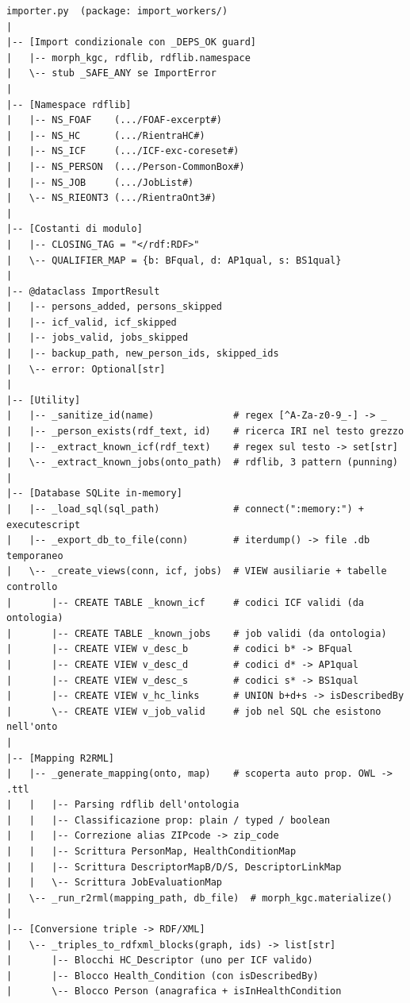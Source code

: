 \documentclass[a4paper,12pt]{article}
\begin{document}
\begin{lstlisting}[caption={Pseudo-outline di \texttt{importer.py}.}, numbers=none]
importer.py  (package: import_workers/)
|
|-- [Import condizionale con _DEPS_OK guard]
|   |-- morph_kgc, rdflib, rdflib.namespace
|   \-- stub _SAFE_ANY se ImportError
|
|-- [Namespace rdflib]
|   |-- NS_FOAF    (.../FOAF-excerpt#)
|   |-- NS_HC      (.../RientraHC#)
|   |-- NS_ICF     (.../ICF-exc-coreset#)
|   |-- NS_PERSON  (.../Person-CommonBox#)
|   |-- NS_JOB     (.../JobList#)
|   \-- NS_RIEONT3 (.../RientraOnt3#)
|
|-- [Costanti di modulo]
|   |-- CLOSING_TAG = "</rdf:RDF>"
|   \-- QUALIFIER_MAP = {b: BFqual, d: AP1qual, s: BS1qual}
|
|-- @dataclass ImportResult
|   |-- persons_added, persons_skipped
|   |-- icf_valid, icf_skipped
|   |-- jobs_valid, jobs_skipped
|   |-- backup_path, new_person_ids, skipped_ids
|   \-- error: Optional[str]
|
|-- [Utility]
|   |-- _sanitize_id(name)              # regex [^A-Za-z0-9_-] -> _
|   |-- _person_exists(rdf_text, id)    # ricerca IRI nel testo grezzo
|   |-- _extract_known_icf(rdf_text)    # regex sul testo -> set[str]
|   \-- _extract_known_jobs(onto_path)  # rdflib, 3 pattern (punning)
|
|-- [Database SQLite in-memory]
|   |-- _load_sql(sql_path)             # connect(":memory:") + executescript
|   |-- _export_db_to_file(conn)        # iterdump() -> file .db temporaneo
|   \-- _create_views(conn, icf, jobs)  # VIEW ausiliarie + tabelle controllo
|       |-- CREATE TABLE _known_icf     # codici ICF validi (da ontologia)
|       |-- CREATE TABLE _known_jobs    # job validi (da ontologia)
|       |-- CREATE VIEW v_desc_b        # codici b* -> BFqual
|       |-- CREATE VIEW v_desc_d        # codici d* -> AP1qual
|       |-- CREATE VIEW v_desc_s        # codici s* -> BS1qual
|       |-- CREATE VIEW v_hc_links      # UNION b+d+s -> isDescribedBy
|       \-- CREATE VIEW v_job_valid     # job nel SQL che esistono nell'onto
|
|-- [Mapping R2RML]
|   |-- _generate_mapping(onto, map)    # scoperta auto prop. OWL -> .ttl
|   |   |-- Parsing rdflib dell'ontologia
|   |   |-- Classificazione prop: plain / typed / boolean
|   |   |-- Correzione alias ZIPcode -> zip_code
|   |   |-- Scrittura PersonMap, HealthConditionMap
|   |   |-- Scrittura DescriptorMapB/D/S, DescriptorLinkMap
|   |   \-- Scrittura JobEvaluationMap
|   \-- _run_r2rml(mapping_path, db_file)  # morph_kgc.materialize()
|
|-- [Conversione triple -> RDF/XML]
|   \-- _triples_to_rdfxml_blocks(graph, ids) -> list[str]
|       |-- Blocchi HC_Descriptor (uno per ICF valido)
|       |-- Blocco Health_Condition (con isDescribedBy)
|       \-- Blocco Person (anagrafica + isInHealthCondition

\end{lstlisting}
\end{document}
